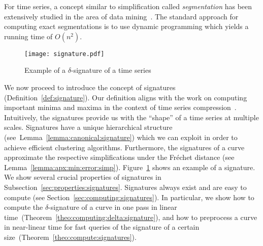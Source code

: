 \documentclass[11pt, letter]{article}
\newcommand{\secref}[1]{Section~\ref{sec:#1}}
\newcommand{\subsecref}[1]{Subsection~\ref{sec:#1}}
\newcommand{\thmref}[1]{Theorem~\ref{theo:#1}}
\newcommand{\lemref}[1]{Lemma~\ref{lemma:#1}}
\newcommand{\figlab}[1]{\label{fig:#1}}
\newcommand{\figref}[1]{Figure~\ref{fig:#1}}
\newcommand{\defref}[1]{Definition~\ref{def:#1}}
\newcommand{\Frechet}{Fr\'echet\xspace}
\begin{document}
For time series, a concept similar to simplification  called 
\emph{segmentation} has been extensively studied in the area of data
mining~\cite{bingham2006segmentation,himberg01,terzi2006efficient}.
The standard approach for computing exact segmentations is to use dynamic
programming which yields a running time of $O(n^2)$.




\begin{figure}[h]
\centering
\texttt{[image: signature.pdf]}
\caption{Example of a $\delta$-signature of a time series}
\figlab{signature}
\end{figure}

We now proceed to introduce the concept of signatures (\defref{signature}).  Our definition
aligns with the work on computing important minima and
maxima in the context of time series compression~\cite{pratt2002search}.
Intuitively, the signatures provide us with the ``shape'' of a time series at
multiple scales.  Signatures have a unique hierarchical structure
(see~\lemref{canonical:signature}) which we can exploit in order to achieve
efficient clustering algorithms. Furthermore, the signatures of a curve
approximate the respective simplifications under the \Frechet distance (see \lemref{apx:min:error:simp}).
\figref{signature} shows an example of a signature. We show several crucial
properties of signatures in \subsecref{properties:signatures}.  Signatures
always exist and are easy to compute (see \secref{computing:signatures}).  In
particular, we show how to compute the $\delta$-signature of a curve in one pass
in linear time~(\thmref{computing:delta:signature}), and how to preprocess a
curve in near-linear time for fast queries of the signature of a certain
size~(\thmref{compute:signatures}). 
\end{document}
